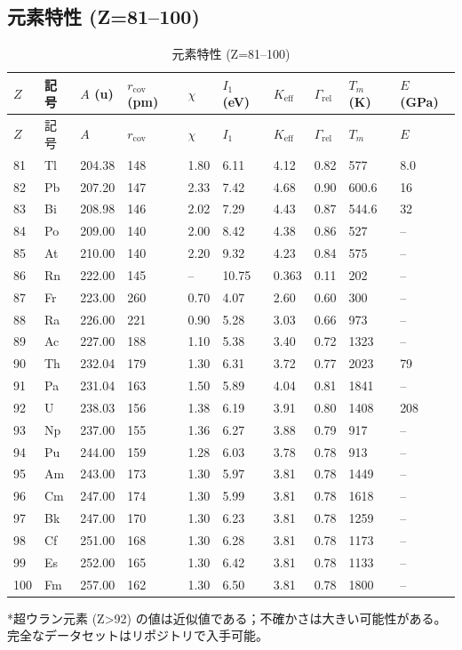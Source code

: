 \documentclass[11pt,a4paper]{article}
\newcommand{\Keff}{K_{\mathrm{eff}}}
\theoremstyle{remark}
\begin{document}
	\subsection*{元素特性 (Z=81–100)}
	
	\begin{longtable}{p{0.6cm}p{1.2cm}p{1.2cm}p{1.2cm}p{1.2cm}p{1.2cm}p{1.5cm}p{1.2cm}p{1.2cm}p{1.2cm}}
		\caption{元素特性 (Z=81–100)} \label{tab:elem-data-81to100} \\
		\toprule
		\(Z\) & 記号 & \(A\) (u) & \(r_{\text{cov}}\) (pm) & \(\chi\) & \(I_1\) (eV) & \(\Keff\) & \(\Gamma_{\text{rel}}\) & \(T_m\) (K) & \(E\) (GPa) \\
		\midrule
		\endfirsthead
		\toprule
		\(Z\) & 記号 & \(A\) & \(r_{\text{cov}}\) & \(\chi\) & \(I_1\) & \(\Keff\) & \(\Gamma_{\text{rel}}\) & \(T_m\) & \(E\) \\
		\midrule
		\endhead
		81 & Tl & 204.38 & 148 & 1.80 & 6.11 & 4.12 & 0.82 & 577 & 8.0 \\
		82 & Pb & 207.20 & 147 & 2.33 & 7.42 & 4.68 & 0.90 & 600.6 & 16 \\
		83 & Bi & 208.98 & 146 & 2.02 & 7.29 & 4.43 & 0.87 & 544.6 & 32 \\
		84 & Po & 209.00 & 140 & 2.00 & 8.42 & 4.38 & 0.86 & 527 & – \\
		85 & At & 210.00 & 140 & 2.20 & 9.32 & 4.23 & 0.84 & 575 & – \\
		86 & Rn & 222.00 & 145 & –    & 10.75 & 0.363 & 0.11 & 202 & – \\
		87 & Fr & 223.00 & 260 & 0.70 & 4.07 & 2.60 & 0.60 & 300 & – \\
		88 & Ra & 226.00 & 221 & 0.90 & 5.28 & 3.03 & 0.66 & 973 & – \\
		89 & Ac & 227.00 & 188 & 1.10 & 5.38 & 3.40 & 0.72 & 1323 & – \\
		90 & Th & 232.04 & 179 & 1.30 & 6.31 & 3.72 & 0.77 & 2023 & 79 \\
		91 & Pa & 231.04 & 163 & 1.50 & 5.89 & 4.04 & 0.81 & 1841 & – \\
		92 & U  & 238.03 & 156 & 1.38 & 6.19 & 3.91 & 0.80 & 1408 & 208 \\
		93 & Np & 237.00 & 155 & 1.36 & 6.27 & 3.88 & 0.79 & 917 & – \\
		94 & Pu & 244.00 & 159 & 1.28 & 6.03 & 3.78 & 0.78 & 913 & – \\
		95 & Am & 243.00 & 173 & 1.30 & 5.97 & 3.81 & 0.78 & 1449 & – \\
		96 & Cm & 247.00 & 174 & 1.30 & 5.99 & 3.81 & 0.78 & 1618 & – \\
		97 & Bk & 247.00 & 170 & 1.30 & 6.23 & 3.81 & 0.78 & 1259 & – \\
		98 & Cf & 251.00 & 168 & 1.30 & 6.28 & 3.81 & 0.78 & 1173 & – \\
		99 & Es & 252.00 & 165 & 1.30 & 6.42 & 3.81 & 0.78 & 1133 & – \\
		100& Fm & 257.00 & 162 & 1.30 & 6.50 & 3.81 & 0.78 & 1800 & – \\
		\bottomrule
	\end{longtable}
	*超ウラン元素 (Z>92) の値は近似値である；不確かさは大きい可能性がある。完全なデータセットはリポジトリで入手可能。
	
\end{document}
